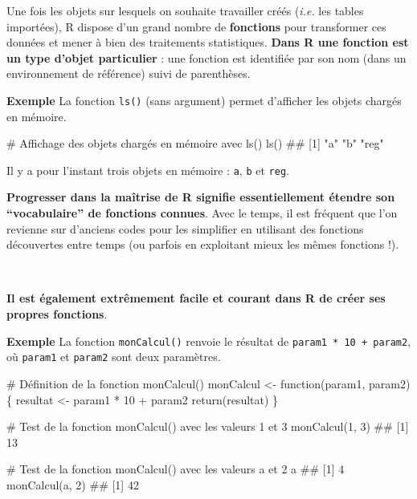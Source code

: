 \documentclass[12pt,twosided, notitlepage]{book}
\newenvironment{Shaded}{}{}
\newcommand{\KeywordTok}[1]{\textcolor[rgb]{0.00,0.00,1.00}{{#1}}}
\newcommand{\DecValTok}[1]{{#1}}
\newcommand{\StringTok}[1]{\textcolor[rgb]{0.00,0.50,0.50}{{#1}}}
\newcommand{\CommentTok}[1]{\textcolor[rgb]{0.00,0.50,0.00}{{#1}}}
\newcommand{\NormalTok}[1]{{#1}}
\renewenvironment{Shaded}{\begin{snugshade}}{\end{snugshade}}
\begin{document}
Une fois les objets sur lesquels on souhaite travailler créés
(\emph{i.e.} les tables importées), R dispose d'un grand nombre de
\textbf{fonctions} pour transformer ces données et mener à bien des
traitements statistiques. \textbf{Dans R une fonction est un type
d'objet particulier} : une fonction est identifiée par son nom (dans un
environnement de référence) suivi de parenthèses.

\textbf{Exemple} La fonction \texttt{ls()} (sans
argument) permet d'afficher les objets chargés en mémoire.

\begin{Shaded}
\begin{Highlighting}[]
\CommentTok{# Affichage des objets chargés en mémoire avec ls()}
\KeywordTok{ls}\NormalTok{()}
  \NormalTok{## [1] "a"   "b"   "reg"}
\end{Highlighting}
\end{Shaded}

Il y a pour l'instant trois objets en mémoire : \texttt{a}, \texttt{b}
et \texttt{reg}.

\textbf{Progresser dans la maîtrise de R signifie essentiellement
étendre son \enquote{vocabulaire} de fonctions connues}. Avec le temps,
il est fréquent que l'on revienne sur d'anciens codes pour les
simplifier en utilisant des fonctions découvertes entre temps (ou
parfois en exploitant mieux les mêmes fonctions !).

~

\textbf{Il est également extrêmement facile et courant dans R de créer
ses propres fonctions}.

\textbf{Exemple} La fonction \texttt{monCalcul()} renvoie le résultat de
\texttt{param1\ *\ 10\ +\ param2}, où \texttt{param1} et \texttt{param2}
sont deux paramètres.

\begin{Shaded}
\begin{Highlighting}[]
\CommentTok{# Définition de la fonction monCalcul()}
\NormalTok{monCalcul <-}\StringTok{ }\NormalTok{function(param1, param2)\{}
  \NormalTok{resultat <-}\StringTok{ }\NormalTok{param1 *}\StringTok{ }\DecValTok{10} \NormalTok{+}\StringTok{ }\NormalTok{param2}
  \KeywordTok{return}\NormalTok{(resultat)}
\NormalTok{\}}

\CommentTok{# Test de la fonction monCalcul() avec les valeurs 1 et 3}
\KeywordTok{monCalcul}\NormalTok{(}\DecValTok{1}\NormalTok{, }\DecValTok{3}\NormalTok{)}
  \NormalTok{## [1] 13}

\CommentTok{# Test de la fonction monCalcul() avec les valeurs a et 2}
\NormalTok{a}
  \NormalTok{## [1] 4}
\KeywordTok{monCalcul}\NormalTok{(a, }\DecValTok{2}\NormalTok{)}
  \NormalTok{## [1] 42}
\end{Highlighting}
\end{Shaded}
\end{document}
